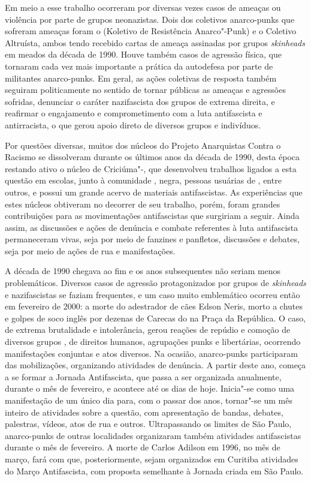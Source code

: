 Em meio a esse trabalho ocorreram por diversas vezes casos de ameaças ou violência por parte de grupos neonazistas. Dois dos coletivos anarco-punks que sofreram ameaças foram o  (Koletivo de Resistência Anarco"-Punk) e o Coletivo Altruísta, ambos tendo recebido cartas de ameaça assinadas por grupos \emph{skinheads} em meados da década de 1990. Houve também casos de agressão física, que tornaram cada vez mais importante a prática da autodefesa por parte de militantes anarco-punks. Em geral, as ações coletivas de resposta também seguiram politicamente no sentido de tornar públicas as ameaças e agressões sofridas, denunciar o caráter nazifascista dos grupos de extrema direita, e reafirmar o engajamento e comprometimento com a luta antifascista e antirracista, o que gerou apoio direto de diversos grupos e indivíduos.

Por questões diversas, muitos dos núcleos do Projeto Anarquistas Contra o Racismo se dissolveram durante os últimos anos da década de 1990, desta época restando ativo o núcleo de Criciúma"-, que desenvolveu trabalhos ligados a esta questão em escolas, junto à comunidade , negra, pessoas usuárias de , entre outros, e possui um grande acervo de materiais antifascistas. As experiências que estes núcleos obtiveram no decorrer de seu trabalho, porém, foram grandes contribuições para as movimentações antifascistas que surgiriam a seguir. Ainda assim, as discussões e ações de denúncia e combate referentes à luta antifascista permaneceram vivas, seja por meio de fanzines e panfletos, discussões e debates, seja por meio de ações de rua e manifestações.

A década de 1990 chegava ao fim e os anos subsequentes não seriam menos problemáticos. Diversos casos de agressão protagonizados por grupos de \emph{skinheads} e nazifascistas se faziam frequentes, e um caso muito emblemático ocorreu então em fevereiro de 2000: a morte do adestrador de cães Edson Neris, morto a chutes e golpes de soco inglês por dezenas de Carecas do  na Praça da República. O caso, de extrema brutalidade e intolerância, gerou reações de repúdio e comoção de diversos grupos , de direitos humanos, agrupações punks e libertárias, ocorrendo manifestações conjuntas e atos diversos. Na ocasião, anarco-punks participaram das mobilizações, organizando atividades de denúncia. A partir deste ano, começa a se formar a Jornada Antifascista, que passa a ser organizada anualmente, durante o mês de fevereiro, e acontece até os dias de hoje. Inicia"-se como uma manifestação de um único dia para, com o passar dos anos, tornar"-se um mês inteiro de atividades sobre a questão, com apresentação de bandas, debates, palestras, vídeos, atos de rua e outros. Ultrapassando os limites de São Paulo, anarco-punks de outras localidades organizaram também atividades antifascistas durante o mês de fevereiro. A morte de Carlos Adilson em 1996, no mês de março, fará com que, \enlargethispage{\baselineskip} posteriormente, sejam organizados em Curitiba atividades do Março Antifascista, com proposta semelhante à Jornada criada em São Paulo.

